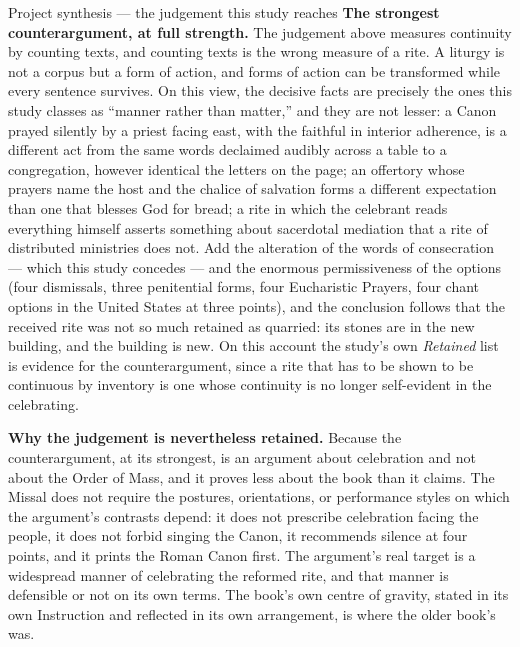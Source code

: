 \begin{studybox}{Project synthesis --- the judgement this study reaches}
\smallskip
\textbf{The strongest counterargument, at full strength.} The judgement above measures continuity
by counting texts, and counting texts is the wrong measure of a rite. A liturgy is not a corpus
but a form of action, and forms of action can be transformed while every sentence survives. On
this view, the decisive facts are precisely the ones this study classes as ``manner rather than
matter,'' and they are not lesser: a Canon prayed silently by a priest facing east, with the
faithful in interior adherence, is a different act from the same words declaimed audibly across
a table to a congregation, however identical the letters on the page; an offertory whose prayers
name the host and the chalice of salvation forms a different expectation than one that blesses
God for bread; a rite in which the celebrant reads everything himself asserts something about
sacerdotal mediation that a rite of distributed ministries does not. Add the alteration of the
words of consecration --- which this study concedes --- and the enormous permissiveness of the
options (four dismissals, three penitential forms, four Eucharistic Prayers, four chant options
in the United States at three points), and the conclusion follows that the received rite was not
so much retained as quarried: its stones are in the new building, and the building is new. On
this account the study's own \emph{Retained} list is evidence for the counterargument, since a
rite that has to be shown to be continuous by inventory is one whose continuity is no longer
self-evident in the celebrating.

\smallskip
\textbf{Why the judgement is nevertheless retained.} Because the counterargument, at its
strongest, is an argument about celebration and not about the Order of Mass, and it proves less
about the book than it claims. The Missal does not require the postures, orientations, or
performance styles on which the argument's contrasts depend: it does not prescribe celebration
facing the people, it does not forbid singing the Canon, it recommends silence at four points,
and it prints the Roman Canon first. The argument's real target is a widespread manner of
celebrating the reformed rite, and that manner is defensible or not on its own terms. The book's
own centre of gravity, stated in its own Instruction and reflected in its own arrangement, is
where the older book's was.


\end{studybox}
